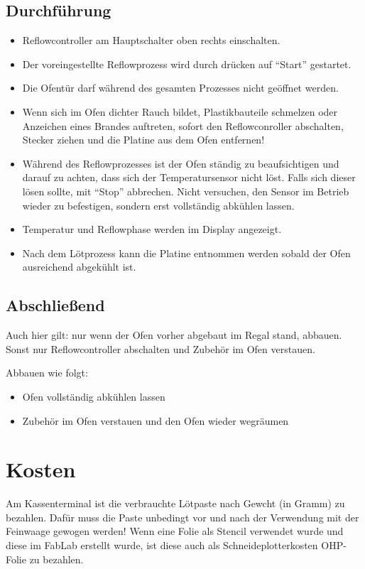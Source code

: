 \documentclass{\basedir/fablab-document}
\begin{document}
\subsection{Durchführung}
\begin{itemize}
	\item Reflowcontroller am Hauptschalter oben rechts einschalten.
	\item Der voreingestellte Reflowprozess wird durch drücken auf \enquote{Start} gestartet.
	\item Die Ofentür darf während des gesamten Prozesses nicht geöffnet werden.
	\item Wenn sich im Ofen dichter Rauch bildet, Plastikbauteile schmelzen oder Anzeichen eines Brandes auftreten, sofort den Reflowconroller abschalten, Stecker ziehen und die Platine aus dem Ofen entfernen!
	\item Während des Reflowprozesses ist der Ofen ständig zu beaufsichtigen und darauf zu achten, dass sich der Temperatursensor nicht löst. Falls sich dieser lösen sollte, mit \enquote{Stop} abbrechen. Nicht versuchen, den Sensor im Betrieb wieder zu befestigen, sondern erst vollständig abkühlen lassen.
	\item Temperatur und Reflowphase werden im Display angezeigt.
	\item Nach dem Lötprozess kann die Platine entnommen werden sobald der Ofen ausreichend abgekühlt ist.
\end{itemize}
\subsection{Abschließend}
Auch hier gilt: nur wenn der Ofen vorher abgebaut im Regal stand, abbauen. Sonst nur Reflowcontroller abschalten und Zubehör im Ofen verstauen.

Abbauen wie folgt:
\begin{itemize}
	\item Ofen vollständig abkühlen lassen
	\item Zubehör im Ofen verstauen und den Ofen wieder wegräumen
\end{itemize}



\section{Kosten}
Am Kassenterminal ist die verbrauchte Lötpaste nach Gewcht (in Gramm) zu bezahlen. Dafür muss die Paste unbedingt vor und nach der Verwendung mit der Feinwaage gewogen werden! Wenn eine Folie als Stencil verwendet wurde und diese im FabLab erstellt wurde, ist diese auch als Schneideplotterkosten OHP-Folie zu bezahlen.


\end{document}
